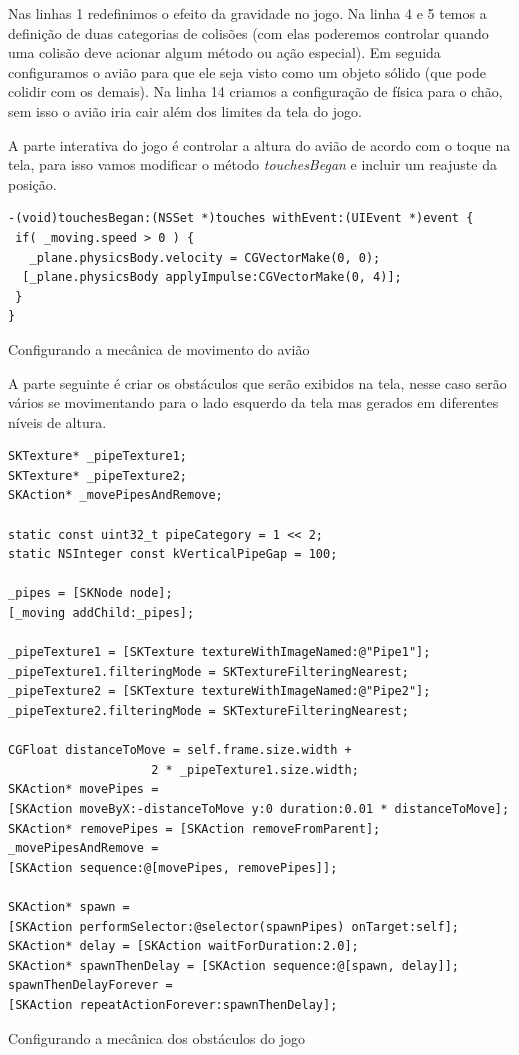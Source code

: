 \documentclass[a4paper,12pt,brazil,oneside]{book}
\begin{document}
Nas linhas 1 redefinimos o efeito da gravidade no jogo. Na linha 4 e 5 temos a definição de duas categorias de colisões (com elas poderemos controlar quando uma colisão deve acionar algum método ou ação especial). Em seguida configuramos o avião para que ele seja visto como um objeto sólido (que pode colidir com os demais). Na linha 14 criamos a configuração de física para o chão, sem isso o avião iria cair além dos limites da tela do jogo.

A parte interativa do jogo é controlar a altura do avião de acordo com o toque na tela, para isso vamos modificar o método \emph{touchesBegan} e incluir um reajuste da posição.

\begin{listing}[H]
\begin{verbatim}
-(void)touchesBegan:(NSSet *)touches withEvent:(UIEvent *)event {
 if( _moving.speed > 0 ) {
   _plane.physicsBody.velocity = CGVectorMake(0, 0);
  [_plane.physicsBody applyImpulse:CGVectorMake(0, 4)];
 }  
}
\end{verbatim}
\caption{Configurando a mecânica de movimento do avião}
\end{listing}

A parte seguinte é criar os obstáculos que serão exibidos na tela, nesse caso serão vários se movimentando para o lado esquerdo da tela mas gerados em diferentes níveis de altura.

\begin{listing}[H]
\begin{verbatim}
SKTexture* _pipeTexture1;
SKTexture* _pipeTexture2;
SKAction* _movePipesAndRemove;
    
static const uint32_t pipeCategory = 1 << 2;
static NSInteger const kVerticalPipeGap = 100;

_pipes = [SKNode node];
[_moving addChild:_pipes];

_pipeTexture1 = [SKTexture textureWithImageNamed:@"Pipe1"];
_pipeTexture1.filteringMode = SKTextureFilteringNearest;
_pipeTexture2 = [SKTexture textureWithImageNamed:@"Pipe2"];
_pipeTexture2.filteringMode = SKTextureFilteringNearest;
        
CGFloat distanceToMove = self.frame.size.width + 
					2 * _pipeTexture1.size.width;
SKAction* movePipes = 
[SKAction moveByX:-distanceToMove y:0 duration:0.01 * distanceToMove];
SKAction* removePipes = [SKAction removeFromParent];
_movePipesAndRemove = 
[SKAction sequence:@[movePipes, removePipes]];
        
SKAction* spawn = 
[SKAction performSelector:@selector(spawnPipes) onTarget:self];
SKAction* delay = [SKAction waitForDuration:2.0];
SKAction* spawnThenDelay = [SKAction sequence:@[spawn, delay]];
spawnThenDelayForever = 
[SKAction repeatActionForever:spawnThenDelay];       
\end{verbatim}
\caption{Configurando a mecânica dos obstáculos do jogo}
\end{listing}
\end{document}
